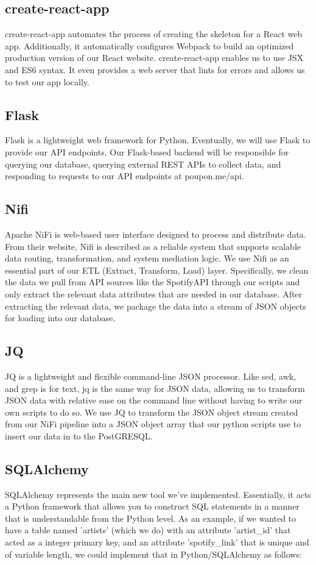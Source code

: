 \documentclass{scrartcl}
\begin{document}
    \subsection{create-react-app}
    create-react-app automates the process of creating the skeleton for a React web app. Additionally, it automatically configures Webpack to build an optimized production version of our React website. create-react-app enables us to use JSX and ES6 syntax. It even provides a web server that lints for errors and allows us to test our app locally.

    \subsection{Flask}
    Flask is a lightweight web framework for Python. Eventually, we will use Flask to provide our API endpoints. Our Flask-based backend will be responsible for querying our database, querying external REST APIs to collect data, and responding to requests to our API endpoints at poupon.me/api.

    \subsection{Nifi}
    Apache NiFi is web-based user interface designed to process and distribute data. From their website, Nifi is described as a reliable system that supports scalable data routing, transformation, and system mediation logic. We use Nifi as an essential part of our ETL (Extract, Transform, Load) layer. Specifically, we clean the data we pull from API sources like the SpotifyAPI through our scripts and only extract the relevant data attributes that are needed in our database. After extracting the relevant data, we package the data into a stream of JSON objects for loading into our database.

    \subsection{JQ}
    JQ is a lightweight and flexible command-line JSON processor. Like sed, awk, and grep is for text, jq is the same way for JSON data, allowing us to transform JSON data with relative ease on the command line without having to write our own scripts to do so. We use JQ to transform the JSON object stream created from our NiFi pipeline into a JSON object array that our python scripts use to insert our data in to the PostGRESQL.

    \subsection{SQLAlchemy}
    SQLAlchemy represents the main new tool we've implemented. Essentially, it acts a Python framework that allows you to construct SQL statements in a manner that is understandable from the Python level. As an example, if we wanted to have a table named 'artists' (which we do) with an attribute 'artist\_id' that acted as a integer primary key, and an attribute 'spotify\_link' that is unique and of variable length, we could implement that in Python/SQLAlchemy as follows:
\end{document}
